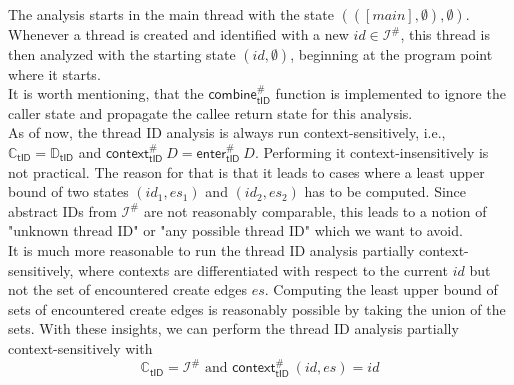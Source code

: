   The analysis starts in the main thread with the state $(([main], \emptyset), \emptyset)$. Whenever a thread is created and identified with a new $id \in \mathcal{I}^{\#}$, this thread is then analyzed with the starting state $(id, \emptyset)$, beginning at the program point where it starts.\\
  It is worth mentioning, that the $\textsf{combine}^{\#}_\textsf{tID}$ function is implemented to ignore the caller state and propagate the callee return state for this analysis.
  \\
  As of now, the thread ID analysis is always run context-sensitively, i.e., $\mathbb{C}_\textsf{tID} = \mathbb{D}_\textsf{tID}$ and $\textsf{context}^{\#}_\textsf{tID}\ D = \textsf{enter}^{\#}_\textsf{tID}\ D$. Performing it context-insensitively is not practical. The reason for that is that it leads to cases where a least upper bound of two states $(id_1, es_1)$ and $(id_2, es_2)$ has to be computed. Since abstract IDs from $\mathcal{I}^{\#}$ are not reasonably comparable, this leads to a notion of "unknown thread ID" or "any possible thread ID" which we want to avoid.\\
  It is much more reasonable to run the thread ID analysis partially context-sensitively, where contexts are differentiated with respect to the current $id$ but not the set of encountered create edges $es$. Computing the least upper bound of sets of encountered create edges is reasonably possible by taking the union of the sets. With these insights, we can perform the thread ID analysis partially context-sensitively with
  \[\mathbb{C}_\textsf{tID} = \mathcal{I}^{\#} \text{ and } \textsf{context}^{\#}_\textsf{tID}\ (id, es) = id\]
